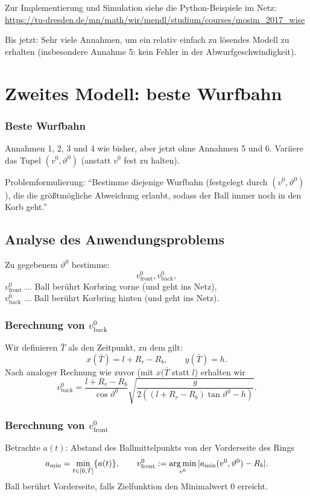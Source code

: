 Zur Implementierung und Simulation siehe die Python-Beispiele im Netz:\\
\url{https://tu-dresden.de/mn/math/wir/mendl/studium/courses/mosim_2017_wise}

Bis jetzt: Sehr viele Annahmen, um ein relativ einfach zu lösendes Modell zu
erhalten (insbesondere Annahme 5: kein Fehler in der Abwurfgeschwindigkeit).

\section{Zweites Modell: beste Wurfbahn}
\subsubsection*{Beste Wurfbahn}
Annahmen 1, 2, 3 und 4 wie bisher, aber jetzt ohne Annahmen 5 und 6. Variiere
das Tupel $(v^0, \vartheta^0)$ (anstatt $v^0$ fest zu halten).

Problemformulierung: ``Bestimme diejenige Wurfbahn (festgelegt durch $(v^0,
\vartheta^0)$), die die größtmögliche Abweichung erlaubt, sodass der Ball immer
noch in den Korb geht.''

\subsection{Analyse des Anwendungsproblems}
Zu gegebenem $\vartheta^0$ bestimme:
\[ v^0_{\text{front}}, v^0_{\text{back}}, \]
$v^0_{\text{front}}$ ... Ball berührt Korbring vorne (und geht ins Netz), \\
$v^0_{\text{back}}$ ... Ball berührt Korbring hinten (und geht ins Netz).

\subsubsection*{Berechnung von $v^0_{\text{back}}$}
Wir definieren $\bar{T}$ als den Zeitpunkt, zu dem gilt:
\[ x(\bar{T}) = l + R_r - R_b, \qquad y(\bar{T}) = h. \]
Nach analoger Rechnung wie zuvor (mit $x(\bar{T}$ statt $l$) erhalten wir
\[ v^0_{\text{back}} = \frac{l+R_r-R_b}{\cos \vartheta^0}
  \sqrt{\frac{g}{2 ((l + R_r - R_b) \tan \vartheta^0 - h)}}. \]

\subsubsection*{Berechnung von $v^0_{\text{front}}$}
Betrachte $a(t)$: Abstand des Ballmittelpunkts von der Vorderseite des Rings
\[ a_{\min} = \min_{t \in [0, \bar{T}]} \{ a(t) \}, \qquad v^0_{\text{front}}
  := \operatorname*{arg\,min}_{v^0} | a_{\min}(v^0, \vartheta^0) - R_b |. \]
Ball berührt Vorderseite, falls Zielfunktion den Minimalwert 0 erreicht.

